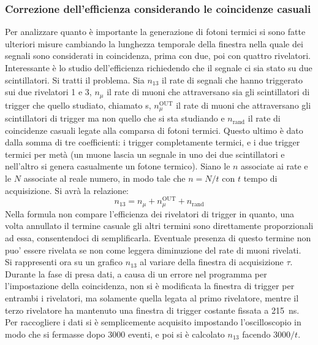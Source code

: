 \subsubsection{Correzione dell'efficienza considerando le coincidenze casuali}
\label{sec:eff_corr}
Per analizzare quanto è importante la generazione di fotoni termici si sono fatte ulteriori misure cambiando la lunghezza temporale della finestra nella quale dei segnali sono considerati in coincidenza, prima con due, poi con quattro rivelatori.
Interessante è lo studio dell'efficienza richiedendo che il segnale ci sia stato su due scintillatori. Si tratti il problema. Sia $n_{13}$ il rate di segnali che hanno triggerato sui due rivelatori 1 e 3, $n_\mu$ il rate di muoni che attraversano sia gli scintillatori di trigger che quello studiato, chiamato s, $n_\mu^\text{OUT}$ il rate di muoni che attraversano gli scintillatori di trigger ma non quello che si sta studiando e $n_\text{rand}$ il rate di coincidenze casuali legate alla comparsa di fotoni termici. Questo ultimo è dato dalla somma di tre coefficienti: i trigger completamente termici, e i due trigger termici per metà (un muone lascia un segnale in uno dei due scintillatori e nell'altro si genera casualmente un fotone termico). Siano le $n$ associate ai rate e le $N$ associate al reale numero, in modo tale che $n=N/t$ con $t$ tempo di acquisizione. Si avrà la relazione:
\begin{equation}
  n_{13} = n_\mu + n_\mu^\text{OUT} + n_\text{rand}
\end{equation}
Nella formula non compare l'efficienza dei rivelatori di trigger in quanto, una volta annullato il termine casuale gli altri termini sono direttamente proporzionali ad essa, consentendoci di semplificarla. Eventuale presenza di questo termine non puo' essere rivelata se non come leggera diminuzione del rate di muoni rivelati.\\
Si rappresenti ora su un grafico $n_{13}$ al variare della finestra di acquisizione $\tau$. Durante la fase di presa dati, a causa di un errore nel programma per l'impostazione della coincidenza, non si è modificata la finestra di trigger per entrambi i rivelatori, ma solamente quella legata al primo rivelatore, mentre il terzo rivelatore ha mantenuto una finestra di trigger costante fissata a 215~ns. Per raccogliere i dati si è semplicemente acquisito impostando l'oscilloscopio in modo
che si fermasse dopo 3000 eventi, e poi si è calcolato $n_{13}$ facendo $3000/t$. %

